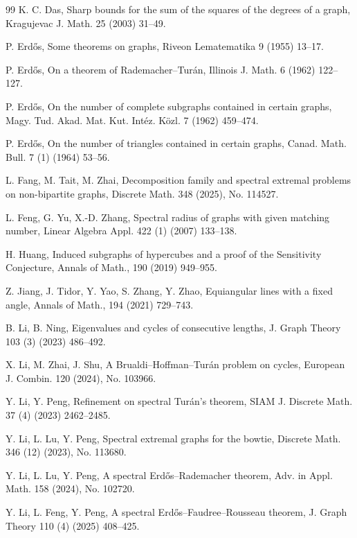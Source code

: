 \documentclass[11pt]{article}
\begin{document}
\begin{thebibliography}{99}
K. C. Das, Sharp bounds for the sum of the squares of the degrees of a graph, 
Kragujevac J. Math. 25 (2003) 31--49. 


P. Erd\H{o}s, Some theorems on graphs,
Riveon Lematematika 9 (1955) 13--17. 


P. Erd\H{o}s,
On a theorem of Rademacher--Tur\'{a}n,
Illinois J. Math. 6 (1962) 122--127. 


P. Erd\H{o}s, 
On the number of complete subgraphs contained in certain graphs, 
Magy. Tud. Akad. Mat. Kut. Int\'{e}z. K\"{o}zl. 7 (1962) 459--474. 


P. Erd\H{o}s,  
On the number of triangles contained in certain graphs, 
Canad. Math. Bull. 7 (1) (1964) 53--56.  

L. Fang, M. Tait, M. Zhai, 
Decomposition family and spectral extremal problems on non-bipartite graphs, 
Discrete Math. 348 (2025), No. 114527.


L. Feng,  G. Yu, X.-D. Zhang, 
 Spectral radius of graphs with given matching number, 
 Linear Algebra Appl. 422 (1) (2007) 133--138. 

H. Huang, 
Induced subgraphs of hypercubes and a proof of the Sensitivity Conjecture, 
Annals of Math., 190 (2019) 949--955.

Z. Jiang,  J. Tidor, Y. Yao, S. Zhang, Y. Zhao, 
 Equiangular lines with a fixed angle, 
Annals of Math., 194 (2021) 729--743.

B. Li, B. Ning,  
Eigenvalues and cycles of consecutive lengths, 
J. Graph Theory 103 (3) (2023) 486--492. 

X. Li, M. Zhai, J. Shu, 
A Brualdi--Hoffman--Tur\'{a}n problem on cycles, 
European J. Combin. 120 (2024), No. 103966. 

 Y. Li, Y. Peng, 
 Refinement on  spectral Tur\'{a}n's theorem, 
 SIAM J. Discrete Math. 37 (4) (2023) 2462--2485.  
 
Y. Li, L. Lu, Y. Peng,
Spectral extremal graphs for the bowtie,
  Discrete Math. 346 (12) (2023), No. 113680. 
  
Y. Li, L. Lu, Y. Peng, 
A spectral Erd\H{o}s--Rademacher theorem, 
Adv. in Appl. Math. 158 (2024), No. 102720. 

Y. Li, L. Feng, Y. Peng, 
A spectral Erd\H{o}s--Faudree--Rousseau theorem, 
J. Graph Theory 110 (4) (2025) 408--425.  


\end{thebibliography}
\end{document}

